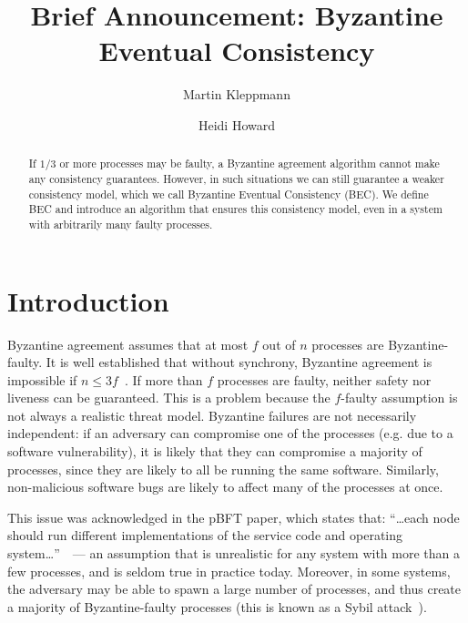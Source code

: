 \documentclass[manuscript,anonymous]{acmart}
\begin{document}
\title{Brief Announcement: Byzantine Eventual Consistency}
\author{Martin Kleppmann}

\author{Heidi Howard}

\begin{abstract}
    If $1/3$ or more processes may be faulty, a Byzantine agreement algorithm cannot make any consistency guarantees.
    However, in such situations we can still guarantee a weaker consistency model, which we call Byzantine Eventual Consistency (BEC).
    We define BEC and introduce an algorithm that ensures this consistency model, even in a system with arbitrarily many faulty processes.
\end{abstract}
\maketitle

\section{Introduction}

Byzantine agreement assumes that at most $f$ out of $n$ processes are Byzantine-faulty.
It is well established that without synchrony, Byzantine agreement is impossible if $n\leq3f$~\cite{Lamport:1982,Dwork:1988,Fischer:1985}.
If more than $f$ processes are faulty, neither safety nor liveness can be guaranteed.
This is a problem because the $f$-faulty assumption is not always a realistic threat model.
Byzantine failures are not necessarily independent: if an adversary can compromise one of the processes (e.g. due to a software vulnerability), it is likely that they can compromise a majority of processes, since they are likely to all be running the same software. 
Similarly, non-malicious software bugs are likely to affect many of the processes at once.

This issue was acknowledged in the pBFT paper, which states that: ``{\dots}each node should run different implementations of the service code and operating system{\dots}''~\cite{Castro:1999}~--- an assumption that is unrealistic for any system with more than a few processes, and is seldom true in practice today.
Moreover, in some systems, the adversary may be able to spawn a large number of processes, and thus create a majority of Byzantine-faulty processes (this is known as a Sybil attack~\cite{Douceur:2002jr}).
\end{document}
